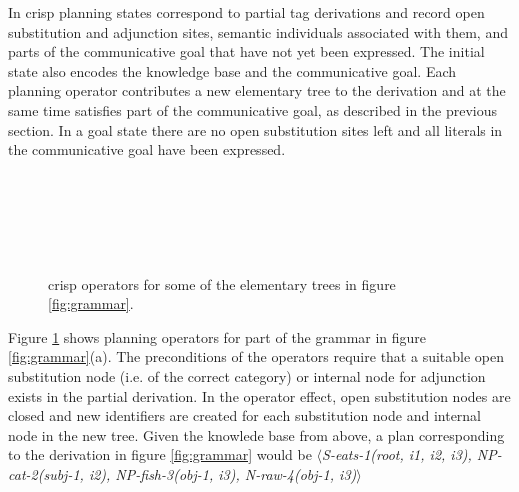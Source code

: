In {\sc crisp} planning states correspond to partial {\sc tag} derivations and record open substitution and adjunction sites, semantic individuals associated with them, and parts of the communicative goal that have not yet been expressed.  The initial state also encodes the knowledge base and the communicative goal. Each planning operator contributes a new elementary tree to the derivation and at the same time satisfies part of the communicative goal, as described in the previous section. In a goal state there are no open substitution sites left and all literals in the communicative goal have been expressed. 
\begin{figure}[t]
\begin{center}
\\\smallskip

\\\smallskip

\\\smallskip
\end{center}
\caption{\label{fig:crisp-operators} {\sc crisp} operators for some of the elementary trees in figure \ref{fig:grammar}.}
\end{figure}


Figure \ref{fig:crisp-operators} shows planning operators for part of the grammar in figure \ref{fig:grammar}(a).
The preconditions of the operators require that a suitable open substitution node (i.e. of the correct category) or internal node for adjunction exists in the partial derivation. In the operator effect, open substitution nodes are closed and new identifiers are created for each substitution node and internal node in the new tree. Given the knowlede base from above, a plan corresponding to the derivation in figure \ref{fig:grammar} would be $\langle${\it S-eats-1(root, i1, i2, i3), NP-cat-2(subj-1, i2), NP-fish-3(obj-1, i3), N-raw-4(obj-1, i3)}$\rangle$

